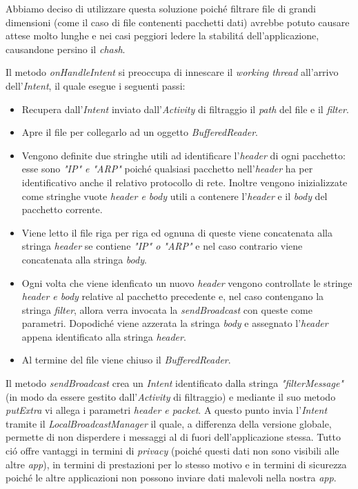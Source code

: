 \documentclass[12pt]{article} %
\begin{document}
Abbiamo deciso di utilizzare questa soluzione poich\'e filtrare file di grandi dimensioni (come il caso di file contenenti pacchetti dati) avrebbe potuto causare attese molto lunghe e nei casi peggiori ledere la stabilit\'a dell'applicazione, causandone persino il \textit{chash}.

Il metodo \textit{onHandleIntent} si preoccupa di innescare il \textit{working thread} all'arrivo dell'\textit{Intent}, il quale esegue i seguenti passi:

\begin{itemize}
\item Recupera dall'\textit{Intent} inviato dall'\textit{Activity} di filtraggio il \textit{path} del file e il \textit{filter}.
\item Apre il file per collegarlo ad un oggetto \textit{BufferedReader}.
\item Vengono definite due stringhe utili ad identificare l'\textit{header} di ogni pacchetto: esse sono \textit{"IP" e "ARP"} poich\'e qualsiasi pacchetto nell'\textit{header} ha per identificativo anche il relativo protocollo di rete. Inoltre vengono inizializzate come stringhe vuote \textit{header e body} utili a contenere l'\textit{header} e il \textit{body} del pacchetto corrente.
\item Viene letto il file riga per riga ed ognuna di queste viene concatenata alla stringa \textit{header} se contiene \textit{"IP" o "ARP"} e nel caso contrario viene concatenata alla stringa \textit{body}.
\item Ogni volta che viene idenficato un nuovo \textit{header} vengono controllate le stringe \textit{header e body} relative al pacchetto precedente e, nel caso contengano la stringa \textit{filter}, allora verra invocata la \textit{sendBroadcast} con queste come parametri. Dopodich\'e viene azzerata la stringa \textit{body} e assegnato l'\textit{header} appena identificato alla stringa \textit{header}.
\item Al termine del file viene chiuso il \textit{BufferedReader}. 
\end{itemize}

Il metodo \textit{sendBroadcast} crea un \textit{Intent} identificato dalla stringa \textit{"filterMessage"} (in modo da essere gestito dall'\textit{Activity} di filtraggio) e mediante il suo metodo \textit{putExtra} vi allega i parametri \textit{header e packet}. A questo punto invia l'\textit{Intent} tramite il \textit{LocalBroadcastManager} il quale, a differenza della versione globale, permette di non disperdere i messaggi al di fuori dell'applicazione stessa. Tutto ci\'o offre vantaggi in termini di \textit{privacy} (poich\'e questi dati non sono visibili alle altre \textit{app}), in termini di prestazioni per lo stesso motivo e in termini di sicurezza poich\'e le altre applicazioni non possono inviare dati malevoli nella nostra \textit{app}.
\end{document}
